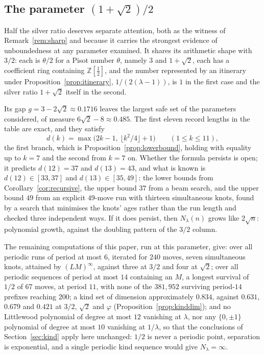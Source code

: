 \documentclass[11pt,reqno]{amsart}
\theoremstyle{plain}
\theoremstyle{definition}
\theoremstyle{remark}
\newcommand{\Z}{\mathbb{Z}}
\begin{document}
\subsection{\texorpdfstring{The parameter $(1+\sqrt2)/2$}{The parameter (1+sqrt2)/2}}
\label{sub:silver}

Half the silver ratio deserves separate attention, both as the witness of
Remark~\ref{rem:sharp} and because it carries the strongest evidence of
unboundedness at any parameter examined. It shares its arithmetic shape with
$3/2$: each is $\theta/2$ for a Pisot number $\theta$, namely $3$ and
$1+\sqrt2$, each has a coefficient ring containing $\Z[\tfrac12]$, and the
number represented by an itinerary under Proposition~\ref{prop:itinerary},
$1/(2(\lambda-1))$, is $1$ in the first case and the silver ratio $1+\sqrt2$
itself in the second.

Its gap $g=3-2\sqrt2\approx0.1716$ leaves the largest safe set of the
parameters considered, of measure $6\sqrt2-8\approx0.485$. The first eleven
record lengths in the table are exact, and they satisfy
\[
  d(k)=\max\bigl(2k-1,\ \lfloor k^2/4\rfloor+1\bigr)
  \qquad(1\leq k\leq 11),
\]
the first branch, which is Proposition~\ref{prop:lowerbound}, holding with
equality up to $k=7$ and the second from $k=7$ on. Whether the formula persists
is open; it predicts $d(12)=37$ and $d(13)=43$, and what is known is
$d(12)\in[33,37]$ and $d(13)\in[35,49]$: the lower bounds from
Corollary~\ref{cor:recursive}, the upper bound $37$ from a beam search, and the
upper bound $49$ from an explicit $49$-move run with thirteen simultaneous
knots, found by a search that minimises the knots' ages rather than the run
length and checked three independent ways. If it does persist, then $N_\lambda(n)$ grows like $2\sqrt n$: polynomial
growth, against the doubling pattern of the $3/2$ column.

The remaining computations of this paper, run at this parameter, give: over all
periodic runs of period at most $6$, iterated for $240$ moves, seven
simultaneous knots, attained by $(LM)^\infty$, against three at $3/2$ and four
at $\sqrt2$; over all periodic sequences of period at most $14$ containing an
$M$, a longest survival of $1/2$ of $67$ moves, at period $11$, with none of the
$381{,}952$ surviving period-$14$ prefixes reaching $200$; a kind set of
dimension approximately $0.834$, against $0.631$, $0.679$ and $0.421$ at $3/2$,
$\sqrt2$ and $\varphi$ (Proposition~\ref{prop:kinddim}); and no Littlewood polynomial of degree at most $12$
vanishing at $\lambda$, nor any $\{0,\pm1\}$ polynomial of degree at most $10$
vanishing at $1/\lambda$, so that the conclusions of Section~\ref{sec:kind}
apply here unchanged: $1/2$ is never a periodic point, separation is
exponential, and a single periodic kind sequence would give
$N_\lambda=\infty$.
\end{document}
